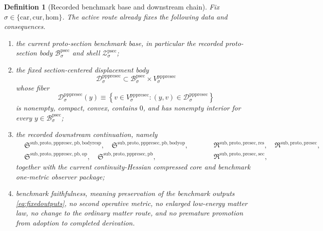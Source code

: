 \documentclass[11pt]{article}
\newcommand{\Car}{\mathrm{car}}
\newcommand{\Cur}{\mathrm{cur}}
\newcommand{\Hom}{\mathrm{hom}}
\newcommand{\ProtoSectionBody}[1]{\mathcal B_{#1}^{\mathrm{psec}}}
\newcommand{\ProtoSectionShell}[1]{\mathcal Z_{#1}^{\mathrm{psec}}}
\newcommand{\PrePreProtoSectionVertical}[1]{V_{#1}^{\mathrm{pppresec}}}
\newcommand{\PrePreProtoSectionResidualBody}[1]{\mathcal D_{#1}^{\mathrm{pppresec}}}
\newcommand{\PullbackBodyResponseCore}{\mathfrak S^{\mathrm{sub,proto,pppresec,pb,bodyresp}}}
\newcommand{\PullbackBodyOperatorCore}{\mathfrak S^{\mathrm{sub,proto,pppresec,pb,bodyop}}}
\newcommand{\PullbackOperatorCore}{\mathfrak S^{\mathrm{sub,proto,pppresec,pb,op}}}
\newcommand{\PrePreProtoSectionPullbackCore}{\mathfrak S^{\mathrm{sub,proto,pppresec,pb}}}
\newcommand{\PreProtoSectionResidualPackage}{\mathfrak R^{\mathrm{sub,proto,presec,res}}}
\newcommand{\PreProtoSectionPackage}{\mathfrak R^{\mathrm{sub,proto,presec}}}
\newcommand{\PreProtoSectionMinSectionCore}{\mathfrak R^{\mathrm{sub,proto,presec,sec}}}
\newtheorem{definition}{Definition}
\begin{document}
\begin{definition}[Recorded benchmark base and downstream chain]
\label{def:route}
Fix \(\sigma\in\{\Car,\Cur,\Hom\}\). The active route already fixes the following data and consequences.
\begin{enumerate}
    \item the current proto-section benchmark base, in particular the recorded proto-section body \(\ProtoSectionBody{\sigma}\) and shell \(\ProtoSectionShell{\sigma}\);
    \item the fixed section-centered displacement body
    \[
    \PrePreProtoSectionResidualBody{\sigma}
    \subset
    \ProtoSectionBody{\sigma}\times\PrePreProtoSectionVertical{\sigma}
    \]
    whose fiber
    \[
    \PrePreProtoSectionResidualBody{\sigma}(y)
    \equiv
    \left\{
    v\in\PrePreProtoSectionVertical{\sigma}:(y,v)\in\PrePreProtoSectionResidualBody{\sigma}
    \right\}
    \]
    is nonempty, compact, convex, contains \(0\), and has nonempty interior for every \(y\in\ProtoSectionBody{\sigma}\);
    \item the recorded downstream continuation, namely
    \[
    \begin{aligned}
    &\PullbackBodyResponseCore,\quad
    \PullbackBodyOperatorCore,\\
    &\PullbackOperatorCore,\quad
    \PrePreProtoSectionPullbackCore,
    \end{aligned}
    \qquad
    \begin{aligned}
    &\PreProtoSectionResidualPackage,\quad
    \PreProtoSectionPackage,\\
    &\PreProtoSectionMinSectionCore,
    \end{aligned}
    \]
    together with the current continuity-Hessian compressed core and benchmark one-metric observer package;
    \item benchmark faithfulness, meaning preservation of the benchmark outputs \eqref{eq:fixedoutputs}, no second operative metric, no enlarged low-energy matter law, no change to the ordinary matter route, and no premature promotion from adoption to completed derivation.
\end{enumerate}
\end{definition}
\end{document}
